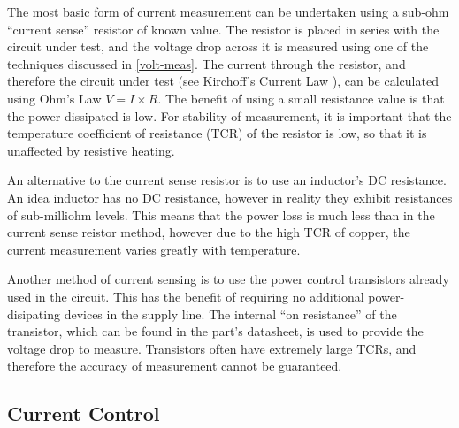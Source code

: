 The most basic form of current measurement can be undertaken using a sub-ohm ``current sense'' resistor of known value. The resistor is placed in series with the circuit under test, and the voltage drop across it is measured using one of the techniques discussed in \ref{volt-meas}. The current through the resistor, and therefore the circuit under test (see Kirchoff's Current Law \cite{kirchoff}), can be calculated using Ohm's Law \cite{ohm} $V = I \times R$. The benefit of using a small resistance value is that the power dissipated is low. For stability of measurement, it is important that the temperature coefficient of resistance (TCR) of the resistor is low, so that it is unaffected by resistive heating. 

An alternative to the current sense resistor is to use an inductor's DC resistance. An idea inductor has no DC resistance, however in reality they exhibit resistances of sub-milliohm levels. This means that the power loss is much less than in the current sense reistor method, however due to the high TCR of copper, the current measurement varies greatly with temperature.

Another method of current sensing is to use the power control transistors already used in the circuit. This has the benefit of requiring no additional power-disipating devices in the supply line. The internal ``on resistance'' of the transistor, which can be found in the part's datasheet, is used to provide the voltage drop to measure. Transistors often have extremely large TCRs, and therefore the accuracy of measurement cannot be guaranteed.


\subsection{Current Control}